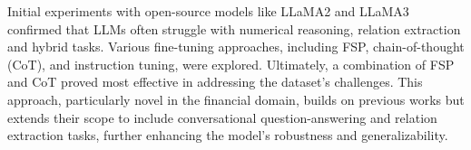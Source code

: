 \documentclass[logo,msc]{infthesis}           %
\begin{document}
Initial experiments with open-source models like LLaMA2 and LLaMA3 confirmed that LLMs often struggle with numerical reasoning, relation extraction and hybrid tasks. Various fine-tuning approaches, including FSP, chain-of-thought (CoT), and instruction tuning, were explored. Ultimately, a combination of FSP and CoT proved most effective in addressing the dataset's challenges. This approach, particularly novel in the financial domain, builds on previous works \cite{kim2023cotcollectionimprovingzeroshot,zhu2024tatllmspecializedlanguagemodel} but extends their scope to include conversational question-answering and relation extraction tasks, further enhancing the model's robustness and generalizability.

\end{document}
